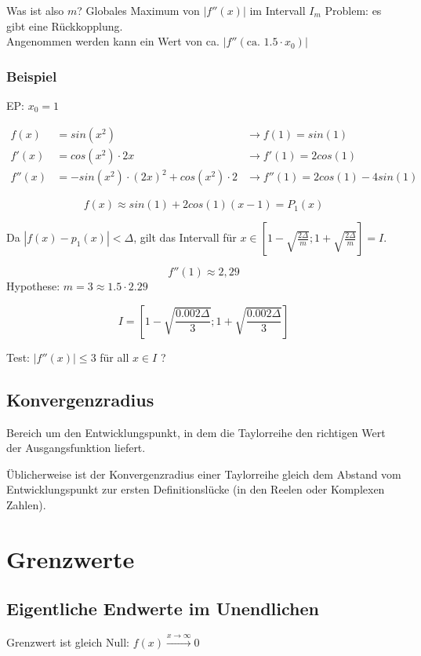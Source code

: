 Was ist also $m$? Globales Maximum von $|f''(x)|$ im Intervall $I_m$
Problem: es gibt eine Rückkopplung. \\
Angenommen werden kann ein Wert von ca. $|f''(\text{ca. } 1.5 \cdot x_0)|$


\subsubsection{Beispiel}
	EP: $x_0 = 1$
	
\begin{align*}
	f(x) &= sin(x^2) &\rightarrow f(1) = sin(1) \\
	f'(x) &= cos(x^2) \cdot 2x &\rightarrow f'(1) = 2 cos(1) \\
	f''(x) &= -sin(x^2) \cdot (2x)^2 + cos(x^2) \cdot 2 &\rightarrow f''(1) = 2 cos(1) - 4 sin(1)
\end{align*}

\[
	f(x) \approx sin(1) + 2 cos(1) (x-1) = P_1(x) 
\]

Da $|f(x) - p_1(x)| < \Delta$, gilt das Intervall für $x \in \left[1-\sqrt{\frac{2 \Delta}{m}}; 1+\sqrt{\frac{2 \Delta}{m}} \right] = I$.

\[
	f''(1) \approx 2,29
\]
Hypothese: $m=3 \approx 1.5 \cdot 2.29$

\[
	I = \left[1-\sqrt{\frac{0.002 \Delta}{3}}; 1+\sqrt{\frac{0.002 \Delta}{3}} \right]
\]

Test: $|f''(x)| \leq 3$ für all $x \in I$ ?

\subsection{Konvergenzradius}

Bereich um den Entwicklungspunkt, in dem die Taylorreihe den richtigen Wert der Ausgangsfunktion liefert.

Üblicherweise ist der Konvergenzradius einer Taylorreihe gleich dem Abstand vom Entwicklungspunkt zur ersten Definitionslücke (in den Reelen oder Komplexen Zahlen).

\section{Grenzwerte}

\subsection{Eigentliche Endwerte im Unendlichen}
Grenzwert ist gleich Null: $f(x) \xrightarrow{x \rightarrow \infty} 0$

